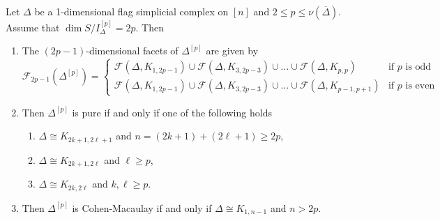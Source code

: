\documentclass[10pt,a4paper]{amsart}
\let\iso=\cong
\begin{document}
\begin{Theorem}\label{Thm: Facet, pure, CM}
    Let $\Delta$ be a 1-dimensional flag simplicial complex on $[n]$ and $2\leq p\leq \nu(\overline{\Delta})$. Assume that $\dim S/I_{\Delta}^{[p]}=2p$. Then
    \begin{enumerate}
   \item The $(2p-1)$-dimensional facets of $\Delta^{[p]}$ are given by 
   \[
   \mathcal{F}_{2p-1}(\Delta^{[p]})= 
   \begin{cases} 
       \mathcal{F}( \Delta, K_{1,2p-1}) \cup \mathcal{F}( \Delta, K_{3,2p-3}) \cup \ldots \cup \mathcal{F}( \Delta, K_{p,p}) & \text{if } p \text{ is odd } \\
     \mathcal{F}( \Delta, K_{1,2p-1}) \cup \mathcal{F}( \Delta, K_{3,2p-3}) \cup \ldots \cup \mathcal{F}( \Delta, K_{p-1,p+1})   & \text{if } p \text{ is even}
   \end{cases}
\]
   
   \item Then $\Delta^{[p]}$ is pure if and only if one of the following holds
     \begin{enumerate}
       \item[(i)] $\Delta \iso K_{2k+1,2\ell+1}$ and $n=(2k+1)+(2\ell+1)\ge 2p$,
       \item[(ii)] $\Delta \iso K_{2k+1,2\ell}$ and $\ell \geq p$,
        \item[(iii)] $\Delta \iso K_{2k,2\ell}$ and $k,\ell \geq p$.
    \end{enumerate}

\item Then  $\Delta^{[p]}$ is Cohen-Macaulay if and only if $\Delta \iso K_{1,n-1}$ and $n>2p$.
    \end{enumerate}
\end{Theorem}
\end{document}
